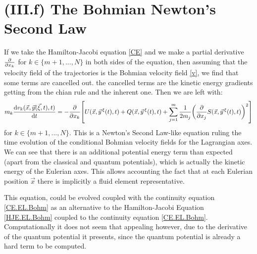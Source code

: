 \documentclass[11pt, a4paper]{article} %
\begin{document}
\section*{(III.f) The Bohmian Newton's Second Law}
If we take the Hamilton-Jacobi equation \eqref{CE} and we make a partial derivative $\pdv{}{x_k}$ for $k\in\{m+1,...,N\}$ in both sides of the equation, then assuming that the velocity field of the trajectories is the Bohmian velocity field \eqref{v}, we find that some terms are cancelled out. the cancelled terms are the kinetic energy gradients getting from the chian rule and the inherent one. Then we are left with:
\begin{equation}
m_k\dv{v_k(\vec{x},\vec{y}(\vec{\xi},t),t)}{t}=-\pdv{}{x_k}\qty[U(\vec{x},\vec{y}^{\, \xi}(t),t)+Q(\vec{x},\vec{y}^{\, \xi}(t),t)+\sum_{j=1}^m \frac{1}{2m_j}\qty(\pdv{}{x_j}S(\vec{x},\vec{y}^{\, \xi}(t),t))^2]
\end{equation}
for  $k\in\{m+1,...,N\}$. This is a Newton's Second Law-like equation ruling the time evolution of the conditional Bohmian velocity fields for the Lagrangian axes. We can see that there is an additional potential energy term than expected (apart from the classical and quantum potentials), which is actually the kinetic energy of the Eulerian axes. This allows accounting the fact that at each Eulerian position $\vec{x}$ there is implicitly a fluid element representative.

This equation, could be evolved coupled with the continuity equation \eqref{CE.EL.Bohm} as an alternative to the Hamilton-Jacobi Equation \eqref{HJE.EL.Bohm} coupled to the continuity equation  \eqref{CE.EL.Bohm}. Computationally it does not seem that appealing however, due to the derivative of the quantum potential it presents, since the quantum potential is already a hard term to be computed.

\end{document}
